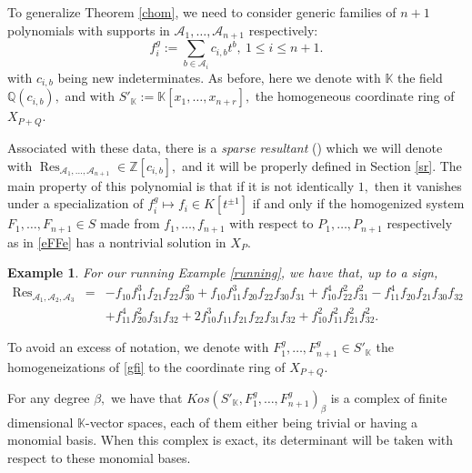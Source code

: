 \documentclass[a4paper,11pt]{amsart}
\newcommand{\Res}{\operatorname{Res}}
\newcommand{\K}{\mathbb{K}}
\newcommand{\Q}{\mathbb{Q}}
\newcommand{\Z}{\mathbb{Z}}
\newcommand{\cA}{{\mathcal A}}
\newcounter{thm}
\numberwithin{thm}{section}
\numberwithin{equation}{section}
\theoremstyle{definition}
\newtheorem{example}[thm]{Example}
\theoremstyle{plain}
\begin{document}
\smallskip
To generalize Theorem \ref{chom}, we need to consider generic families of $n+1$ polynomials with supports in $\cA_1,\ldots, \cA_{n+1}$ respectively:
\begin{equation}\label{gfi}
f^g_i:=\sum_{b\in\cA_i} c_{i,b} t^b, \ 1\leq i\leq n+1.
\end{equation}
with $c_{i,b}$ being new indeterminates.  As before, here we denote with $\K$ the field $\Q(c_{i,b}),$ and with $S'_\K:=\K[x_1,\ldots, x_{n+r}],$ the homogeneous coordinate ring of $X_{P+Q}$.


Associated with these data, there is a {\em sparse resultant} (\cite{GKZ94,CLO05, DS15}) which we will denote with $\Res_{\cA_1,\ldots, \cA_{n+1}}\in\Z[c_{i,b}],$ and it will be properly defined in Section \ref{sr}. The main property of this polynomial is that if it is not identically $1,$ then it vanishes under a specialization of $f^g_i\mapsto f_i\in K[t^{\pm1}]$ if and only if the homogenized system $F_1,\ldots, F_{n+1}\in S$ made from $f_1,\ldots, f_{n+1}$ with respect to $P_1,\ldots, P_{n+1}$ respectively as in  \eqref{eFFe}  has a nontrivial solution in $X_P.$

\begin{example}
{\em 
For our running Example \ref{running}, we have that, up to a sign, 
\begin{equation}\label{res123}
\begin{array}{ccl}
\Res_{\cA_1,\cA_2,\cA_3}&=&-f_{10} f_{11}^3 f_{21} f_{22} f_{30}^2 + f_{10} f_{11}^3 f_{20} f_{22} f_{30} f_{31} + 
  f_{10}^4 f_{22}^2 f_{31}^2 - f_{11}^4 f_{20} f_{21} f_{30} f_{32} \\ &&  + f_{11}^4 f_{20}^2 f_{31} f_{32} + 
  2 f_{10}^3 f_{11} f_{21} f_{22} f_{31} f_{32} + f_{10}^2 f_{11}^2 f_{21}^2 f_{32}^2.
  \end{array}
  \end{equation}}
  \end{example}
  
To avoid an excess of notation, we denote with $F^g_1,\ldots, F^g_{n+1}\in S'_\K$ the homogeneizations of \eqref{gfi} to the coordinate ring of $X_{P+Q}.$

For any degree $\beta,$ we have that $Kos(S'_\K,F^g_1,\ldots, F^g_{n+1})_{\beta}$ is a complex of finite dimensional $\K$-vector spaces, each of them either being trivial or having a monomial basis. When this complex is exact, its determinant  will be taken with respect to these monomial bases.
\end{document}
